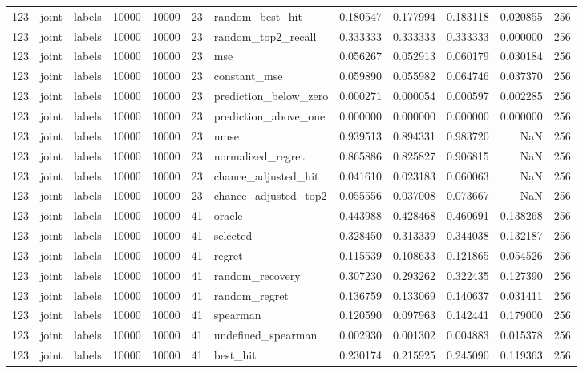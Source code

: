 \begin{tabular}{rllrrrlrrrrr}
123 & joint & labels & 10000 & 10000 & 23 & random_best_hit & 0.180547 & 0.177994 & 0.183118 & 0.020855 & 256 \\
123 & joint & labels & 10000 & 10000 & 23 & random_top2_recall & 0.333333 & 0.333333 & 0.333333 & 0.000000 & 256 \\
123 & joint & labels & 10000 & 10000 & 23 & mse & 0.056267 & 0.052913 & 0.060179 & 0.030184 & 256 \\
123 & joint & labels & 10000 & 10000 & 23 & constant_mse & 0.059890 & 0.055982 & 0.064746 & 0.037370 & 256 \\
123 & joint & labels & 10000 & 10000 & 23 & prediction_below_zero & 0.000271 & 0.000054 & 0.000597 & 0.002285 & 256 \\
123 & joint & labels & 10000 & 10000 & 23 & prediction_above_one & 0.000000 & 0.000000 & 0.000000 & 0.000000 & 256 \\
123 & joint & labels & 10000 & 10000 & 23 & nmse & 0.939513 & 0.894331 & 0.983720 & NaN & 256 \\
123 & joint & labels & 10000 & 10000 & 23 & normalized_regret & 0.865886 & 0.825827 & 0.906815 & NaN & 256 \\
123 & joint & labels & 10000 & 10000 & 23 & chance_adjusted_hit & 0.041610 & 0.023183 & 0.060063 & NaN & 256 \\
123 & joint & labels & 10000 & 10000 & 23 & chance_adjusted_top2 & 0.055556 & 0.037008 & 0.073667 & NaN & 256 \\
123 & joint & labels & 10000 & 10000 & 41 & oracle & 0.443988 & 0.428468 & 0.460691 & 0.138268 & 256 \\
123 & joint & labels & 10000 & 10000 & 41 & selected & 0.328450 & 0.313339 & 0.344038 & 0.132187 & 256 \\
123 & joint & labels & 10000 & 10000 & 41 & regret & 0.115539 & 0.108633 & 0.121865 & 0.054526 & 256 \\
123 & joint & labels & 10000 & 10000 & 41 & random_recovery & 0.307230 & 0.293262 & 0.322435 & 0.127390 & 256 \\
123 & joint & labels & 10000 & 10000 & 41 & random_regret & 0.136759 & 0.133069 & 0.140637 & 0.031411 & 256 \\
123 & joint & labels & 10000 & 10000 & 41 & spearman & 0.120590 & 0.097963 & 0.142441 & 0.179000 & 256 \\
123 & joint & labels & 10000 & 10000 & 41 & undefined_spearman & 0.002930 & 0.001302 & 0.004883 & 0.015378 & 256 \\
123 & joint & labels & 10000 & 10000 & 41 & best_hit & 0.230174 & 0.215925 & 0.245090 & 0.119363 & 256 \\

\end{tabular}
